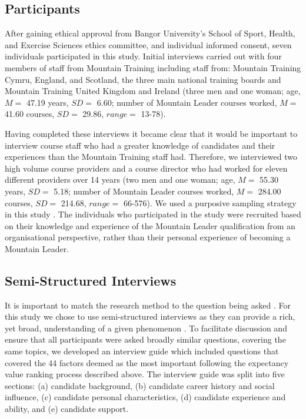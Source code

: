 \documentclass[
  12pt,
  a4paper,
]{book}
\begin{document}
\hypertarget{participants}{%
\subsection{Participants}\label{participants}}

After gaining ethical approval from Bangor University's School of Sport, Health, and Exercise Sciences ethics committee, and individual informed consent, seven individuals participated in this study. Initial interviews carried out with four members of staff from Mountain Training including staff from: Mountain Training Cymru, England, and Scotland, the three main national training boards and Mountain Training United Kingdom and Ireland (three men and one woman; age, \(M =\) 47.19 years, \(SD =\) 6.60; number of Mountain Leader courses worked, \(M =\) 41.60 courses, \(SD =\) 29.86, \(range =\) 13-78).

Having completed these interviews it became clear that it would be important to interview course staff who had a greater knowledge of candidates and their experiences than the Mountain Training staff had. Therefore, we interviewed two high volume course providers and a course director who had worked for eleven different providers over 14 years (two men and one woman; age, \(M =\) 55.30 years, \(SD =\) 5.18; number of Mountain Leader courses worked, \(M =\) 284.00 courses, \(SD =\) 214.68, \(range =\) 66-576). We used a purposive sampling strategy in this study \citep{Patton2002, Sparkes2014}. The individuals who participated in the study were recruited based on their knowledge and experience of the Mountain Leader qualification from an organisational perspective, rather than their personal experience of becoming a Mountain Leader.

\hypertarget{semi-structured-interviews}{%
\subsection{Semi-Structured Interviews}\label{semi-structured-interviews}}

It is important to match the research method to the question being asked \citep{Smith2016}. For this study we chose to use semi-structured interviews as they can provide a rich, yet broad, understanding of a given phenomenon \citep{Lincoln1985}. To facilitate discussion and ensure that all participants were asked broadly similar questions, covering the same topics, we developed an interview guide which included questions that covered the 44 factors deemed as the most important following the expectancy value ranking process described above. The interview guide was split into five sections: (a) candidate background, (b) candidate career history and social influence, (c) candidate personal characteristics, (d) candidate experience and ability, and (e) candidate support.
\end{document}
